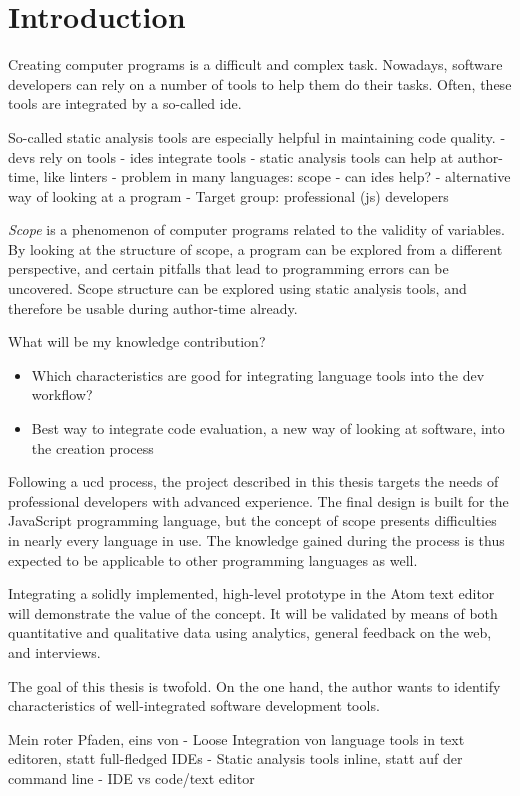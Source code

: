\chapter{Introduction}\label{introduction}

Creating computer programs is a difficult and complex task. Nowadays,
software developers can rely on a number of tools to help them do their
tasks. Often, these tools are integrated by a so-called \ac{ide}.

So-called static analysis tools are especially helpful in maintaining
code quality. - devs rely on tools - ides integrate tools - static
analysis tools can help at author-time, like linters - problem in many
languages: scope - can ides help? - alternative way of looking at a
program - Target group: professional (js) developers

\emph{Scope} is a phenomenon of computer programs related to the
validity of variables. By looking at the structure of scope, a program
can be explored from a different perspective, and certain pitfalls that
lead to programming errors can be uncovered. Scope structure can be
explored using static analysis tools, and therefore be usable during
author-time already.

What will be my knowledge contribution?

\begin{itemize}
\itemsep1pt\parskip0pt
\item
  Which characteristics are good for integrating language tools into the
  dev workflow?
\item
  Best way to integrate code evaluation, a new way of looking at
  software, into the creation process
\end{itemize}

Following a \ac{ucd} process, the project described in this thesis
targets the needs of professional developers with advanced experience.
The final design is built for the JavaScript programming language, but
the concept of scope presents difficulties in nearly every language in
use. The knowledge gained during the process is thus expected to be
applicable to other programming languages as well.

Integrating a solidly implemented, high-level prototype in the Atom text
editor will demonstrate the value of the concept. It will be validated
by means of both quantitative and qualitative data using analytics,
general feedback on the web, and interviews.

The goal of this thesis is twofold. On the one hand, the author wants to
identify characteristics of well-integrated software development tools.

Mein roter Pfaden, eins von - Loose Integration von language tools in
text editoren, statt full-fledged IDEs - Static analysis tools inline,
statt auf der command line - IDE vs code/text editor
